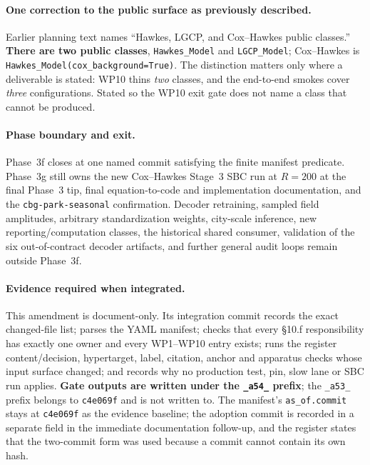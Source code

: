 \documentclass[
  10pt,
]{article}
\begin{document}
\paragraph{One correction to the public surface as previously described.}

Earlier planning text names ``Hawkes, LGCP, and Cox--Hawkes public classes.''
\textbf{There are two public classes}, \texttt{Hawkes\_Model} and
\texttt{LGCP\_Model}; Cox--Hawkes is \texttt{Hawkes\_Model(cox\_background=True)}.
The distinction matters only where a deliverable is stated: WP10 thins
\emph{two} classes, and the end-to-end smokes cover \emph{three}
configurations. Stated so the WP10 exit gate does not name a class that cannot
be produced.

\paragraph{Phase boundary and exit.}

Phase~3f closes at one named commit satisfying the finite manifest predicate.
Phase~3g still owns the new Cox--Hawkes Stage~3 SBC run at $R=200$ at the final
Phase~3 tip, final equation-to-code and implementation documentation, and the
\texttt{cbg-park-seasonal} confirmation. Decoder retraining, sampled field
amplitudes, arbitrary standardization weights, city-scale inference, new
reporting/computation classes, the historical shared consumer, validation of the
six out-of-contract decoder artifacts, and further general audit loops remain
outside Phase~3f.

\paragraph{Evidence required when integrated.}

This amendment is document-only. Its integration commit records the exact
changed-file list; parses the YAML manifest; checks that every \S10.f
responsibility has exactly one owner and every WP1--WP10 entry exists; runs the
register content/decision, hypertarget, label, citation, anchor and apparatus
checks whose input surface changed; and records why no production test, pin,
slow lane or SBC run applies. \textbf{Gate outputs are written under the
\texttt{\_a54\_} prefix}; the \texttt{\_a53\_} prefix belongs to \texttt{c4e069f}
and is not written to. The manifest's \texttt{as\_of.commit} stays at
\texttt{c4e069f} as the evidence baseline; the adoption commit is recorded in a
separate field in the immediate documentation follow-up, and the register states
that the two-commit form was used because a commit cannot contain its own hash.
\end{document}
